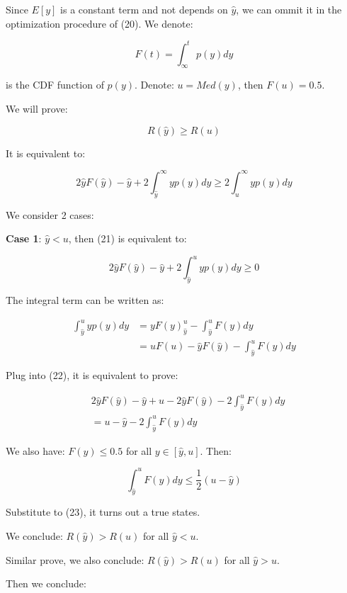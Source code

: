 \documentclass{article}
\begin{document}
Since $E[y]$ is a constant term and not depends on $\hat{y}$, we can ommit it in the optimization procedure of (20).
We denote:

$$
F(t) = \int_{\infty}^{t}p(y)dy
$$

is the CDF function of $p(y)$. Denote: $u=Med(y)$, then $F(u)=0.5$.

We will prove:

$$
R(\hat{y})\geq R(u)
$$

It is equivalent to:

\begin{equation}
2\hat{y}F(\hat{y})-\hat{y}+2\int_{\hat{y}}^{\infty}yp(y)dy\geq 2\int_{u}^{\infty}yp(y)dy
\end{equation}

We consider 2 cases:

\textbf{Case 1}: $\hat{y}<u$, then (21) is equivalent to:

\begin{equation}
    2\hat{y}F(\hat{y})-\hat{y}+2\int_{\hat{y}}^uyp(y)dy\geq 0
\end{equation}

The integral term can be written as:

$$
\begin{aligned}
    \int_{\hat{y}}^uyp(y)dy&=yF(y)_{\hat{y}}^{u}-\int_{\hat{y}}^uF(y)dy\\
    &=uF(u)-\hat{y}F(\hat{y})-\int_{\hat{y}}^{u}F(y)dy
\end{aligned}
$$

Plug into (22), it is equivalent to prove:

\begin{equation}
    \begin{aligned}
        &2\hat{y}F(\hat{y})-\hat{y}+u-2\hat{y}F(\hat{y})-2\int_{\hat{y}}^{u}F(y)dy\\
        &=u-\hat{y}-2\int_{\hat{y}}^uF(y)dy
    \end{aligned}
\end{equation}

We also have: $F(y)\leq 0.5$ for all $y\in [\hat{y}, u]$. Then:

$$
\int_{\hat{y}}^uF(y)dy\leq \frac{1}{2}(u-\hat{y})
$$

Substitute to (23), it turns out a true states.

We conclude: $R(\hat{y})>R(u)$ for all $\hat{y}<u$.

Similar prove, we also conclude: $R(\hat{y})>R(u)$ for all $\hat{y}>u$.

Then we conclude:
\end{document}
